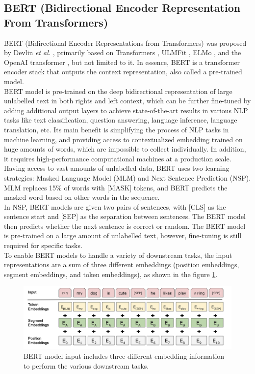 \documentclass[%
	BCOR=8mm, %
	DIV=12,
	toc=bibliography, %
	toc=listof, %
	oneside, %
	egregdoesnotlikesansseriftitles, %
	]{scrbook}
\begin{document}
\subsection{BERT (Bidirectional Encoder Representation From Transformers)}
BERT (Bidirectional Encoder Representations from Transformers) was proposed by Devlin \textit{et al.} \cite{devlin_bert_2019-1}, primarily based on Transformers \cite{vaswani_attention_2017}, ULMFit \cite{howard_universal_2018}, ELMo \cite{peters_deep_2018-3}, and the OpenAI transformer \cite{radford_improving_nodate}, but not limited to it. In essence, BERT is a transformer encoder stack that outputs the context representation, also called a pre-trained model. \\
BERT model is pre-trained on the deep bidirectional representation of large unlabelled text in both rights and left context, which can be further fine-tuned by adding additional output layers to achieve state-of-the-art results in various NLP tasks like text classification, question answering, language inference, language translation, etc. Its main benefit is simplifying the process of NLP tasks in machine learning, and providing access to contextualized embedding trained on huge amounts of words, which are impossible to collect individually. In addition, it requires high-performance computational machines at a production scale. \\
Having access to vast amounts of unlabelled data,  BERT uses two learning strategies: Masked Language Model (MLM) and Next Sentence Prediction (NSP). MLM replaces 15\% of words with [MASK] tokens, and BERT predicts the masked word based on other words in the sequence.\\
In NSP, BERT models are given two pairs of sentences, with [CLS] as the sentence start and [SEP] as the separation between sentences. The BERT model then predicts whether the next sentence is correct or random. The BERT model is pre-trained on a large amount of unlabelled text, however, fine-tuning is still required for specific tasks.\\
To enable BERT models to handle a variety of downstream tasks, the input representations are a sum of three different embeddings (position embeddings, segment embeddings, and token embeddings), as shown in the figure \ref{fig:bert_inp}.
\begin{figure}[H]
    \centering
    \includegraphics[width=0.65\linewidth]{img/bert_inp.png}
    \caption[Three different embeddings in BERT model]{\small BERT model input includes three different embedding information to perform the various downstream tasks\cite{devlin_bert_2019-1}. }
    \label{fig:bert_inp}
\end{figure}
\end{document}
